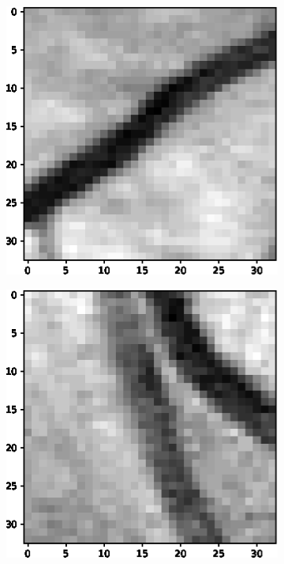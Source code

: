 \documentclass[aps,prb,10pt,twocolumn,groupedaddress]{revtex4-1}
\begin{document}
\begin{figure}[!t]
	\centering
	\begin{subfigure}[]{0.22\textwidth}
		\centering
		\includegraphics[width=\textwidth]{images/positive1.eps}
		\caption{}
	\end{subfigure}
	\hspace{1.55cm}
	\centering
	\begin{subfigure}[]{0.22\textwidth}
		\centering
		\includegraphics[width=\textwidth]{images/positive2.eps}

\end{subfigure}
\end{figure}
\end{document}
